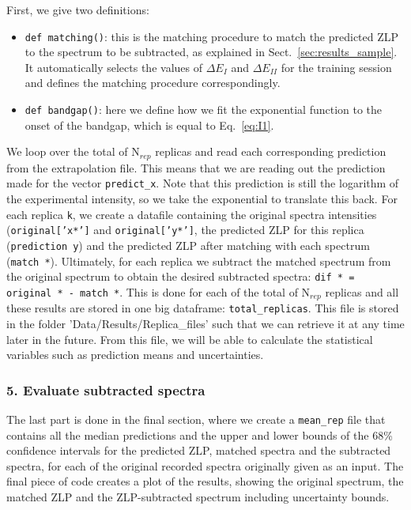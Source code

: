 First, we give two definitions: 

\begin{itemize}
\item {\tt def matching()}: this is the matching procedure to match the predicted ZLP to the spectrum
to be subtracted, as explained in Sect.~\ref{sec:results_sample}. 
%
It automatically selects the
values of $\Delta E_I$ and $\Delta E_{II}$ for the training session and defines the matching procedure
correspondingly.
\item {\tt def bandgap()}: here we define how we fit the exponential function to the onset of the bandgap,
which is equal to Eq.~\ref{eq:I1}. 
\end{itemize}


We loop over the total of N$_{rep}$ replicas and read each corresponding prediction from the 
extrapolation file. 
%
This means that we are reading out the prediction made for the vector {\tt predict\_x}. Note that
this prediction is still the logarithm of the experimental intensity, so we take the exponential
to translate this back.
%
For each replica {\tt k}, we create a datafile containing the original spectra intensities 
({\tt original['x*']} and {\tt original['y*']}, the predicted ZLP for this replica ({\tt prediction y}) 
and the predicted ZLP after matching with each spectrum ({\tt match *}). 
%
Ultimately, for each replica we subtract the matched spectrum from the original spectrum 
to obtain the desired subtracted spectra: {\tt dif * = original * - match *}. 
%
This is done for each of the total of N$_{rep}$ replicas and all these results are stored in one big 
dataframe: {\tt total\_replicas}. 
%
This file is stored in the folder 'Data/Results/Replica\_files' such that we can retrieve it at any time
later in the future. 
%
From this file, we will be able to calculate the
statistical variables such as prediction means and uncertainties. 

\subsubsection*{5. Evaluate subtracted spectra}
%
The last part is done in the final section, where we create a {\tt mean\_rep} file that contains
all the median predictions and the upper and lower bounds of the 68\% confidence intervals for 
the predicted ZLP, matched spectra and the subtracted spectra, for each of the original recorded
spectra originally given as an input. 
%
The final piece of code creates a plot of the results, showing the original spectrum, the matched
ZLP and the ZLP-subtracted spectrum including uncertainty bounds. 






















